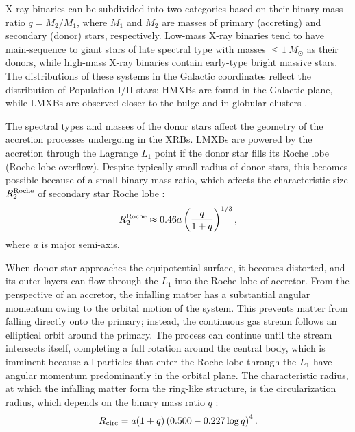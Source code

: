 X-ray binaries can be subdivided into two categories based on their binary mass ratio $q = M_2 / M_1$, where $M_1$ and $M_2$ are masses of primary (accreting) and secondary (donor) stars, respectively.
Low-mass X-ray binaries tend to have main-sequence to giant stars of late spectral type with masses $ \le 1~M_\odot$ as their donors, while high-mass X-ray binaries contain early-type bright massive stars.
The distributions of these systems in the Galactic coordinates reflect the distribution of Population I/II stars: \glspl{HMXB} are found in the Galactic plane, while \glspl{LMXB} are observed closer to the bulge and in globular clusters \citep{Casares2017}.

The spectral types and masses of the donor stars affect the geometry of the accretion processes undergoing in the \glspl{XRB}.
\glspl{LMXB} are powered by the accretion through the Lagrange $L_1$ point if the donor star fills its Roche lobe (Roche lobe overflow).
Despite typically small radius of donor stars, this becomes possible because of a small binary mass ratio, which affects the characteristic size $R_2^{\mathrm{Roche}}$ of secondary star Roche lobe \citep{Eggleton1983, Paczynski1983}:
\begin{equation}
    R_2^{\mathrm{Roche}} \approx 0.46 a \left(\frac{q}{1 + q}\right)^{1/3},
\end{equation}
where $a$ is major semi-axis.

When donor star approaches the equipotential surface, it becomes distorted, and its outer layers can flow through the $L_1$ into the Roche lobe of accretor.
From the perspective of an accretor, the infalling matter has a substantial angular momentum owing to the orbital motion of the system.
This prevents matter from falling directly onto the primary; instead, the continuous gas stream follows an elliptical orbit around the primary.
The process can continue until the stream intersects itself, completing a full rotation around the central body, which is imminent because all particles that enter the Roche lobe through the $L_1$ have angular momentum predominantly in the orbital plane.
The characteristic radius, at which the infalling matter form the ring-like structure, is the circularization radius, which depends on the binary mass ratio $q$ \citep{Plavec1964, AccretionPower}:
\begin{equation}
    R_{\mathrm{circ}} = a (1 + q)\left(0.500 - 0.227 \log q\right)^4.
\end{equation}



